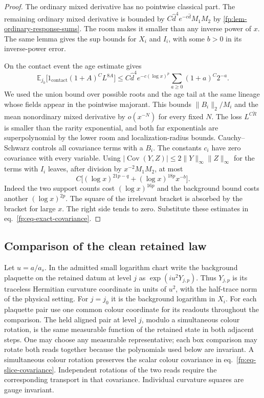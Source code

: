 \documentclass[11pt,letterpaper,reqno]{amsart}
\numberwithin{equation}{section}
\renewcommand{\eqref}[1]{\textup{eq.~\ref{#1}}}
\theoremstyle{definition}
\theoremstyle{remark}
\begin{document}
\begin{proof}
The ordinary mixed derivative has no pointwise classical part.
The remaining ordinary mixed derivative is bounded by
$C\widehat d^4 e^{-c\widehat d}M_1M_2$ by
\cref{fp:lem-ordinary-response-sums}. The room makes it
smaller than any inverse power of $x$. The same lemma gives
the sup bounds for $X_i$ and $I_i$, with some $b>0$ in its
inverse-power error.

On the contact event the age estimate gives
\[
 \mathbb E_{j_0}\big[1_{\mathrm{contact}}(1+A)^C L^{8A}\big]
 \le C\widehat d^4 e^{-c(\log x)^p}
                  \sum_{a\ge0}(1+a)^C2^{-a}.
\]
We used the union bound over possible roots and the age tail at
the same lineage whose fields appear in the pointwise majorant.
This bounds $\|B_i\|_2/M_i$ and the mean nonordinary mixed
derivative by $o(x^{-N})$ for every fixed $N$. The loss
$L^{C\check R}$ is smaller than the rarity exponential, and
both far exponentials are superpolynomial by the lower
room and localization-radius bounds.
Cauchy--Schwarz controls all covariance terms with a $B_i$.
The constants $c_i$ have zero covariance with every variable.
Using $|\operatorname{Cov}(Y,Z)|\le2\|Y\|_\infty\|Z\|_\infty$
for the terms with $I_i$ leaves, after division by $x^{-2}M_1M_2$,
at most
\[
 C\big[(\log x)^{21p-q}+(\log x)^{18p}x^{-b}\big].
\]
Indeed the two support counts cost $(\log x)^{16p}$ and the
background bound costs another $(\log x)^{2p}$. The square of the
irrelevant bracket is absorbed by the bracket for large $x$.
The right side tends to zero. Substitute these estimates in
\eqref{fp:eq-exact-covariance}.
\end{proof}

\subsection{Comparison of the clean retained law}
\label{fp:sec-clean-kernels}

Let $u=a/a_s$. In the admitted small logarithm chart write the
background plaquette on the retained datum at level $j$ as
$\exp(iu^2Y_{j,p})$. Thus $Y_{j,p}$ is its traceless Hermitian
curvature coordinate in units of $u^2$, with the half-trace norm
of the physical setting. For $j=j_0$ it is the
background logarithm in $X_i$. For each plaquette pair use one
common colour coordinate for its readouts throughout the
comparison. The held aligned pair at level $j$, modulo a
simultaneous colour rotation, is the same measurable function of
the retained state in both adjacent steps. One may choose any
measurable representative; each box comparison may rotate both
reads together because the polynomials used below are invariant.
A simultaneous colour rotation preserves the scalar colour covariance in
\eqref{fp:eq-slice-covariance}. Independent rotations of the two
reads require the corresponding transport in that covariance.
Individual curvature squares are gauge invariant.
\end{document}
